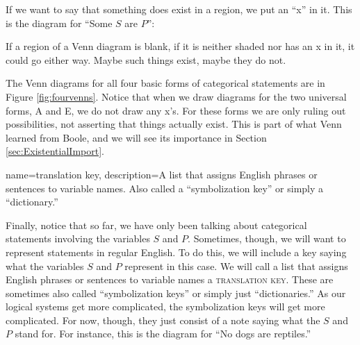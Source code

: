 \begin{center}
\end{center}


If we want to say that something does exist in a region, we put an ``x'' in it. This is the diagram for ``Some $S$ are $P$'':

\begin{center}
\end{center}

If a region of a Venn diagram is blank, if it is neither shaded nor has an x in it, it could go either way. Maybe such things exist, maybe they do not.

The Venn diagrams for all four basic forms of categorical statements are in Figure \ref{fig:fourvenns}. Notice that when we draw diagrams for the two universal forms, A and E, we do not draw any x's. For these forms we are only ruling out possibilities, not asserting that things actually exist. This is part of what Venn learned from Boole, and we will see its importance in Section \ref{sec:ExistentialImport}.

{
name=translation key,
description={A list that assigns English phrases or sentences to variable names. Also called a ``symbolization key''  or simply a ``dictionary.''}
}

Finally, notice that so far, we have only been talking about categorical statements involving the variables $S$ and $P$. Sometimes, though, we will want to represent statements in regular English. To do this, we will include a key saying what the variables $S$ and $P$ represent in this case. We will call a list that assigns English phrases or sentences to variable names a \textsc{\gls{translation key}}.\label{def:translation_key} These are sometimes also called ``symbolization keys'' or simply just ``dictionaries.'' As our logical systems get more complicated, the symbolization keys will get more complicated. For now, though, they just consist of a note saying what the $S$ and $P$ stand for. For instance, this is the diagram for ``No dogs are reptiles.''

